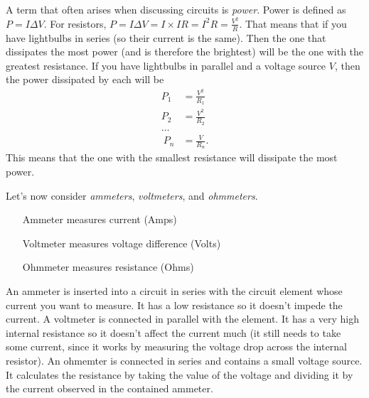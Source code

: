 \documentclass[nobib]{tufte-handout}
\begin{document}
A term that often arises when discussing circuits is \emph{power}. 
Power is defined as $P = I \Delta V$. For 
resistors, $P = I \Delta V = I \times IR = I^2 R = \frac{V^2}{R}$. 
That means that if you have lightbulbs in series 
(so their current is the same). Then the 
one that dissipates the most power 
(and is therefore the brightest) will 
be the one with the greatest resistance. 
If you have lightbulbs in parallel and a voltage source $V$, 
then the power dissipated by each will be 
\begin{align*}
    P_1 &= \frac{V^2}{R_1} \\
    P_2 &= \frac{V^2}{R_2} \\
    \dots \\\
    P_n &= \frac{V}{R_n}.
\end{align*}
This means that the one with the smallest 
resistance will dissipate the most power. 

Let's now consider \emph{ammeters}, 
\emph{voltmeters}, and \emph{ohmmeters}. 
\begin{itemize}
    \item[Ammeter] measures current (Amps)
    \item[Voltmeter] measures voltage difference (Volts)
    \item[Ohmmeter] measures resistance (Ohms)  
\end{itemize}
An ammeter is inserted into a circuit in series with the circuit
element whose current you want to measure. It has a low resistance 
so it doesn't impede the current. A voltmeter is connected 
in parallel with the element. It has a very high 
internal resistance so it doesn't affect the current much 
(it still needs to take some current, since it 
works by measuring the voltage drop across 
the internal resistor). An ohmemter is connected 
in series and contains a small voltage source. 
It calculates the resistance by taking the 
value of the voltage and dividing it by 
the current observed in the contained ammeter. 
\end{document}
